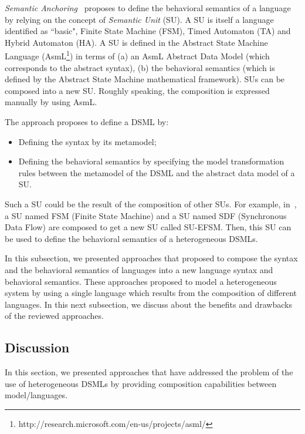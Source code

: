 \emph{Semantic Anchoring}~\cite{semanticsanchoring} proposes to define the behavioral semantics of a language by relying on the concept of \emph{Semantic Unit} (SU). A SU is itself a language identified as ``basic", \eg Finite State Machine (FSM), Timed Automaton (TA) and Hybrid Automaton (HA). A SU is defined in the Abstract State Machine Language (AsmL\footnote{http://research.microsoft.com/en-us/projects/asml/}) in terms of (a) an AsmL Abstract Data Model (which corresponds to the abstract syntax), (b) the behavioral semantics (which is defined by the Abstract State Machine mathematical framework). SUs can be composed into a new SU. Roughly speaking, the composition is expressed manually by using AsmL. 

The approach proposes to define a DSML by:
\begin{itemize}
	\item Defining the syntax by its metamodel; 
	\item Defining the behavioral semantics by specifying the model transformation rules between the metamodel of the DSML and the abstract data model of a SU.   
\end{itemize}
Such a SU could be the result of the composition of other SUs. For example, in~\cite{composemanticanch}, a SU named FSM (Finite State Machine) and a SU named SDF (Synchronous Data Flow) are composed to get a new SU called SU-EFSM. Then, this SU can be used to define the behavioral semantics of a heterogeneous DSMLs.

In this subsection, we presented approaches that proposed to compose the syntax and the behavioral semantics of languages into a new language syntax and behavioral semantics. These approaches proposed to model a heterogeneous system by using a single language which results from the composition of different languages. In this next subsection, we discuss about the benefits and drawbacks of the reviewed approaches.

\subsection{Discussion}
In this section, we presented approaches that have addressed the problem of the use of heterogeneous DSMLs by providing composition capabilities between model/languages.

